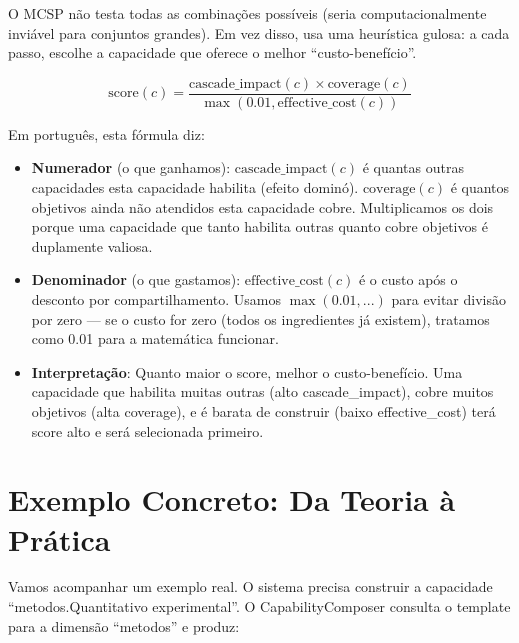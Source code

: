 O MCSP não testa todas as combinações possíveis (seria computacionalmente inviável para conjuntos grandes). Em vez disso, usa uma heurística gulosa: a cada passo, escolhe a capacidade que oferece o melhor ``custo-benefício''.

\begin{equation}
\text{score}(c) = \frac{\text{cascade\_impact}(c) \times \text{coverage}(c)}{\max(0.01, \text{effective\_cost}(c))}
\label{eq:greedy_score}
\end{equation}

Em português, esta fórmula diz:

\begin{itemize}
    \item \textbf{Numerador} (o que ganhamos): $\text{cascade\_impact}(c)$ é quantas outras capacidades esta capacidade habilita (efeito dominó). $\text{coverage}(c)$ é quantos objetivos ainda não atendidos esta capacidade cobre. Multiplicamos os dois porque uma capacidade que tanto habilita outras quanto cobre objetivos é duplamente valiosa.
    
    \item \textbf{Denominador} (o que gastamos): $\text{effective\_cost}(c)$ é o custo após o desconto por compartilhamento. Usamos $\max(0.01, ...)$ para evitar divisão por zero — se o custo for zero (todos os ingredientes já existem), tratamos como 0.01 para a matemática funcionar.
    
    \item \textbf{Interpretação}: Quanto maior o score, melhor o custo-benefício. Uma capacidade que habilita muitas outras (alto cascade\_impact), cobre muitos objetivos (alta coverage), e é barata de construir (baixo effective\_cost) terá score alto e será selecionada primeiro.
\end{itemize}

\section{Exemplo Concreto: Da Teoria à Prática}


Vamos acompanhar um exemplo real. O sistema precisa construir a capacidade ``metodos.Quantitativo experimental''. O CapabilityComposer consulta o template para a dimensão ``metodos'' e produz:

